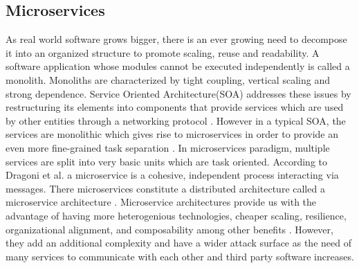 \subsection{Microservices}
\label{chap:microservices}

As real world software grows bigger, there is an ever growing need to decompose it into an organized structure to promote scaling, reuse and readability. A software application whose modules cannot be executed independently is called a monolith. Monoliths are characterized by tight coupling, vertical scaling and strong dependence. Service Oriented Architecture(SOA) addresses these issues by restructuring its elements into components that provide services which are used by other entities through a networking protocol \cite{papazoglou2003service}. However in a typical SOA, the services are monolithic which gives rise to microservices in order to provide an even more fine-grained task separation \cite{ahmadvand2016requirements}.
In microservices paradigm, multiple services are split into very basic units which are task oriented. According to Dragoni et al. a microservice is a cohesive, independent process interacting via messages. There microservices constitute a distributed architecture called a microservice architecture \cite{dragoni2017microservices}. Microservice architectures provide us with the advantage of having more heterogenious technologies, cheaper scaling, resilience, organizational alignment, and composability among other benefits \cite{newman2015building}. However, they add an additional complexity and have a wider attack surface as the need of many services to communicate with each other and third party software increases. 

